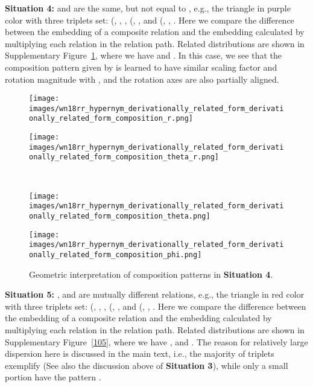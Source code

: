 \documentclass[11pt]{article}
\begin{document}
\textbf{Situation 4:}  and  are the same, but not equal to , e.g., the triangle in purple color with three triplets set: (, , , (, ,  and (, , . Here we compare the difference between the embedding of a composite relation and the embedding calculated by multiplying each relation in the relation path. Related distributions are shown in Supplementary Figure~\ref{011}, where we have  and . In this case, we see that the composition pattern given by  is learned to have similar scaling factor  and rotation magnitude  with , and the rotation axes  are also partially aligned.
 

\begin{figure}[htbp]
\centering
\begin{minipage}{3.5cm}
\centering
\texttt{[image: images/wn18rr\_hypernym\_derivationally\_related\_form\_derivationally\_related\_form\_composition\_r.png]}
\subcaption{\tiny{}}
\end{minipage}
\begin{minipage}{3.5cm}
\centering
\texttt{[image: images/wn18rr\_hypernym\_derivationally\_related\_form\_derivationally\_related\_form\_composition\_theta\_r.png]}
\subcaption{\tiny{}}
\end{minipage}
\\
\begin{minipage}{3.5cm}
\centering
\texttt{[image: images/wn18rr\_hypernym\_derivationally\_related\_form\_derivationally\_related\_form\_composition\_theta.png]}
\subcaption{\tiny{}}
\end{minipage}
\begin{minipage}{3.5cm}
\centering
\texttt{[image: images/wn18rr\_hypernym\_derivationally\_related\_form\_derivationally\_related\_form\_composition\_phi.png]}
\subcaption{\tiny{}}
\end{minipage}
\caption{Geometric interpretation of composition patterns in \textbf{Situation 4}.}
\label{011}
\end{figure}


\textbf{Situation 5:} ,  and  are mutually different relations, e.g., the triangle in red color with three triplets set: (, , , (, ,  and (, , . Here we compare the difference between the embedding of a composite relation and the embedding calculated by multiplying each relation in the relation path. Related distributions are shown in Supplementary Figure~\ref{105}, where we have ,  and . The reason for relatively large dispersion here is discussed in the main text, i.e., the majority of triplets exemplify  (See also the discussion above of \textbf{Situation 3}), while only a small portion have the pattern . 
\end{document}

